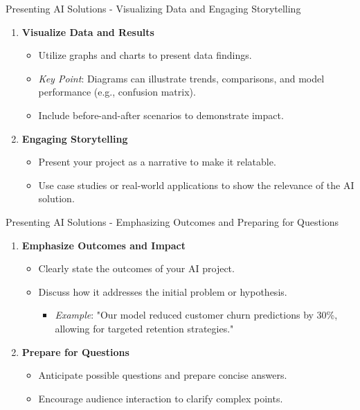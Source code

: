\documentclass[aspectratio=169]{beamer}
\begin{document}
\begin{frame}[fragile]{Presenting AI Solutions - Visualizing Data and Engaging Storytelling}
    \begin{enumerate}[resume]
        \item \textbf{Visualize Data and Results}
        \begin{itemize}
            \item Utilize graphs and charts to present data findings.
            \item \textit{Key Point}: Diagrams can illustrate trends, comparisons, and model performance (e.g., confusion matrix).
            \item Include before-and-after scenarios to demonstrate impact.
        \end{itemize}

        \item \textbf{Engaging Storytelling}
        \begin{itemize}
            \item Present your project as a narrative to make it relatable.
            \item Use case studies or real-world applications to show the relevance of the AI solution.
        \end{itemize}
    \end{enumerate}
\end{frame}

\begin{frame}[fragile]{Presenting AI Solutions - Emphasizing Outcomes and Preparing for Questions}
    \begin{enumerate}[resume]
        \item \textbf{Emphasize Outcomes and Impact}
        \begin{itemize}
            \item Clearly state the outcomes of your AI project.
            \item Discuss how it addresses the initial problem or hypothesis.
            \begin{itemize}
                \item \textit{Example}: "Our model reduced customer churn predictions by 30\%, allowing for targeted retention strategies."
            \end{itemize}
        \end{itemize}

        \item \textbf{Prepare for Questions}
        \begin{itemize}
            \item Anticipate possible questions and prepare concise answers.
            \item Encourage audience interaction to clarify complex points.
        \end{itemize}
    \end{enumerate}
\end{frame}
\end{document}
